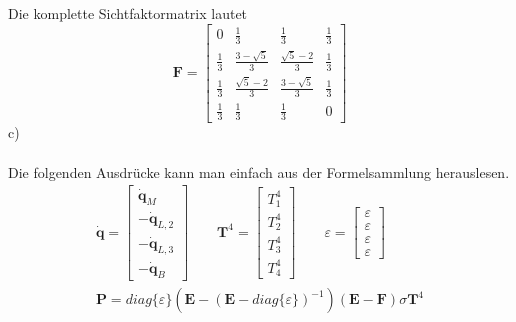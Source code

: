 \newpage
\noindent
Die komplette Sichtfaktormatrix lautet
\[
	\textbf{F} = \left[\begin{matrix}
	0 & \frac{1}{3} & \frac{1}{3} & \frac{1}{3} \\
	\frac{1}{3} & \frac{3 - \sqrt{5}}{3} & \frac{\sqrt{5} - 2}{3} & \frac{1}{3} \\
	\frac{1}{3} & \frac{\sqrt{5} - 2}{3} & \frac{3 - \sqrt{5}}{3} & \frac{1}{3} \\
	\frac{1}{3} & \frac{1}{3} & \frac{1}{3} & 0
	\end{matrix}\right]
\]
c) \\ \\
Die folgenden Ausdrücke kann man einfach aus der Formelsammlung herauslesen. 
\begin{align*}
	\dot{\textbf{q}} = \left[\begin{matrix}
		\dot{\textbf{q}}_M \\
		-\dot{\textbf{q}}_{L,2} \\
		-\dot{\textbf{q}}_{L,3} \\
		-\dot{\textbf{q}}_B
	\end{matrix}\right]
	\qquad
	\textbf{T}^4 = \left[\begin{matrix}
		T_1^4 \\
		T_2^4 \\
		T_3^4 \\
		T_4^4
	\end{matrix}\right]
	\qquad
	\varepsilon = \left[\begin{matrix}
		\varepsilon \\
		\varepsilon \\
		\varepsilon \\
		\varepsilon
	\end{matrix}\right] \\
	\textbf{P} = diag\{\varepsilon\}\left(\textbf{E} - \left(\textbf{E} - diag\{\varepsilon\}\right)^{-1}\right)\left(\textbf{E}-\textbf{F}\right)\sigma\textbf{T}^4
\end{align*}